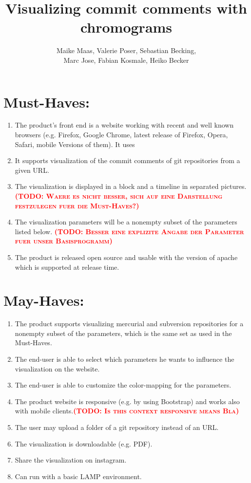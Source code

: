 \documentclass[10pt]{scrartcl}
\author{Maike Maas, Valerie Poser, Sebastian Becking,\\
Marc Jose, Fabian Kosmale, Heiko Becker}
\title{Visualizing commit comments with chromograms}
\newcommand{\todo}[1]{\textbf{\textsc{\textcolor{red}{(TODO: #1)}}}}
\begin{document}
\maketitle
\section{Must-Haves:}
\begin{enumerate}
\item The product's front end is a website working with recent and well known browsers (e.g. Firefox, Google Chrome, latest release of Firefox, Opera, Safari, mobile Versions of them). It uses
\item It supports visualization of the commit comments of git repositories from a given URL.
\item The visualization is displayed in a block and a timeline in separated pictures.
\todo{Waere es nicht besser, sich auf eine Darstellung festzulegen fuer die Must-Haves?}
\item The visualization parameters will be a nonempty subset of the parameters listed below. \todo{Besser eine explizite Angabe der Parameter fuer unser Basisprogramm}
\item The product is released open source and usable with the version of apache which is supported at release time.
\end{enumerate}
\section{May-Haves:}
\begin{enumerate}
\item The product supports visualizing mercurial and subversion repositories for a nonempty subset of the parameters, which is the same set as used in the Must-Haves.
\item The end-user is able to select which parameters he wants to influence the visualization on the website.
\item The end-user is able to customize the color-mapping for the parameters.
\item The product website is responsive (e.g. by using Bootstrap) and works also with mobile clients.\todo{ Is this context responsive means Bla}
\item The user may upload a folder of a git repository instead of an URL.
\item The visualization is downloadable (e.g. PDF).
\item Share the visualization on instagram.
\item Can run with a basic LAMP environment.
\end{enumerate}
\end{document}
